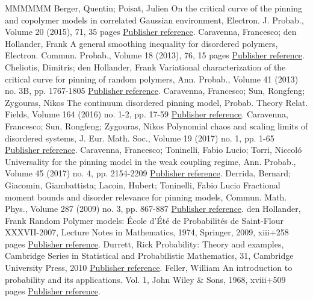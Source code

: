 \begin{thebibliography}{MMMMMM}
 Berger, Quentin; Poisat, Julien On the critical curve of the pinning and copolymer models in correlated Gaussian environment, Electron. J. Probab., Volume 20 (2015), 71, 35 pages \href{https://ahl.centre-mersenne.org/item/AHL_2019__2__281_0/#BP15}{Publisher reference}.
 Caravenna, Francesco; den Hollander, Frank A general smoothing inequality for disordered polymers, Electron. Commun. Probab., Volume 18 (2013), 76, 15 pages \href{https://ahl.centre-mersenne.org/item/AHL_2019__2__281_0/#CadH13}{Publisher reference}.
 Cheliotis, Dimitris; den Hollander, Frank Variational characterization of the critical curve for pinning of random polymers, Ann. Probab., Volume 41 (2013) no. 3B, pp. 1767-1805 \href{https://ahl.centre-mersenne.org/item/AHL_2019__2__281_0/#CdH13}{Publisher reference}.
 Caravenna, Francesco; Sun, Rongfeng; Zygouras, Nikos The continuum disordered pinning model, Probab. Theory Relat. Fields, Volume 164 (2016) no. 1-2, pp. 17-59 \href{https://ahl.centre-mersenne.org/item/AHL_2019__2__281_0/#CSZ16}{Publisher reference}.
 Caravenna, Francesco; Sun, Rongfeng; Zygouras, Nikos Polynomial chaos and scaling limits of disordered systems, J. Eur. Math. Soc., Volume 19 (2017) no. 1, pp. 1-65 \href{https://ahl.centre-mersenne.org/item/AHL_2019__2__281_0/#CSZ16+}{Publisher reference}.
 Caravenna, Francesco; Toninelli, Fabio Lucio; Torri, Niccoló Universality for the pinning model in the weak coupling regime, Ann. Probab., Volume 45 (2017) no. 4, pp. 2154-2209 \href{https://ahl.centre-mersenne.org/item/AHL_2019__2__281_0/#CTT16+}{Publisher reference}.
 Derrida, Bernard; Giacomin, Giambattista; Lacoin, Hubert; Toninelli, Fabio Lucio Fractional moment bounds and disorder relevance for pinning models, Commun. Math. Phys., Volume 287 (2009) no. 3, pp. 867-887 \href{https://ahl.centre-mersenne.org/item/AHL_2019__2__281_0/#DGLT09}{Publisher reference}.
 den Hollander, Frank Random Polymer models: École d’Été de Probabilités de Saint-Flour XXXVII-2007, Lecture Notes in Mathematics, 1974, Springer, 2009, xiii+258 pages \href{https://ahl.centre-mersenne.org/item/AHL_2019__2__281_0/#dH09}{Publisher reference}.
 Durrett, Rick Probability: Theory and examples, Cambridge Series in Statistical and Probabilistic Mathematics, 31, Cambridge University Press, 2010 \href{https://ahl.centre-mersenne.org/item/AHL_2019__2__281_0/#Du10}{Publisher reference}.
 Feller, William An introduction to probability and its applications. Vol. 1, John Wiley \& Sons, 1968, xviii+509 pages \href{https://ahl.centre-mersenne.org/item/AHL_2019__2__281_0/#Feller68}{Publisher reference}.

\end{thebibliography}
